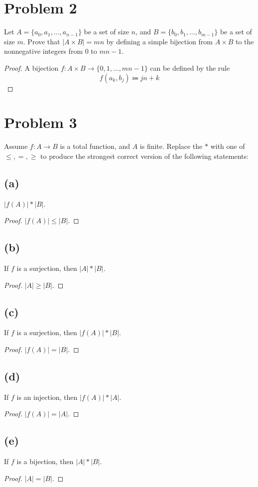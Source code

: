 \documentclass[14pt]{extarticle}
\begin{document}
\section{Problem 2}
Let $A = \{a_0, a_1, \ldots, a_{n-1}\}$ be a set of size $n$, and $B = \{b_0, b_1, \ldots, b_{m - 1}\}$ be a set of size $m$. Prove that $|A \times B| = mn$ by defining a simple bijection from $A\times B$ to the nonnegative integers from 0 to $mn - 1$.
\begin{proof}
A bijection $f : A\times B \to \{0, 1, \ldots , mn - 1\}$ can be defined by the rule
$$
f(a_k, b_j) \Coloneqq jn + k
$$
\end{proof}

\section{Problem 3}
Assume $f:A\to B$ is a total function, and $A$ is finite. Replace the $*$ with one of $\leq, =, \geq$ to produce the strongest correct version of the following statements:
\subsection{(a)}
$|f(A)| * |B|$.
\begin{proof}
$|f(A)| \leq |B|$.
\end{proof}

\subsection{(b)}
If $f$ is a surjection, then $|A| * |B|$.
\begin{proof}
$|A| \geq |B|$.
\end{proof}

\subsection{(c)}
If $f$ is a surjection, then $|f(A)| * |B|$.
\begin{proof}
$|f(A)| = |B|$.
\end{proof}

\subsection{(d)}
If $f$ is an injection, then $|f(A)| * |A|$.
\begin{proof}
$|f(A)| = |A|$.
\end{proof}

\subsection{(e)}
If $f$ is a bijection, then $|A| * |B|$.
\begin{proof}
$|A| = |B|$.
\end{proof}
\end{document}
